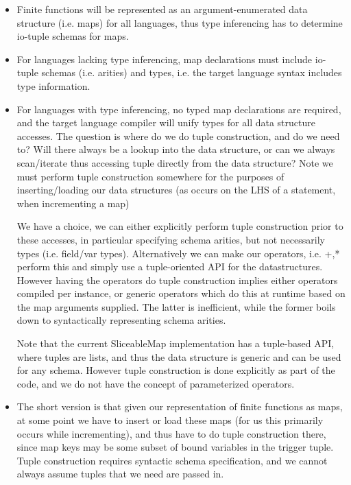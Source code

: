 \noindent{}
\begin{itemize}
  \item Finite functions will be represented as an argument-enumerated data
  structure (i.e. maps) for all languages, thus type inferencing has to
  determine io-tuple schemas for maps.
  \item For languages lacking type inferencing, map declarations must include
  io-tuple schemas (i.e. arities) and types, i.e. the target language syntax
  includes type information.
  \item For languages with type inferencing, no typed map declarations are
  required, and the target language compiler will unify types for all data
  structure accesses.
  The question is where do we do tuple construction, and do we need to? 
  Will there always be a lookup into the data structure, or can we always
  scan/iterate thus accessing tuple directly from the data structure?
  Note we must perform tuple construction somewhere for the purposes of
  inserting/loading our data structures (as occurs on the LHS of a statement,
  when incrementing a map)
  
  We have a choice, we can either explicitly perform tuple construction
  prior to these accesses, in particular specifying schema arities, but not
  necessarily types (i.e. field/var types).
  Alternatively we can make our operators, i.e. +,* perform this and simply use
  a tuple-oriented API for the datastructures. However having the operators do
  tuple construction implies either operators compiled per instance, or generic
  operators which do this at runtime based on the map arguments supplied. The
  latter is inefficient, while the former boils down to syntactically
  representing schema arities.
  
  Note that the current SliceableMap implementation has a tuple-based API,
  where tuples are lists, and thus the data structure is generic and can be
  used for any schema. However tuple construction is done explicitly as part of
  the code, and we do not have the concept of parameterized operators.
  
  \item The short version is that given our representation of finite functions
  as maps, at some point we have to insert or load these maps (for us this
  primarily occurs while incrementing), and thus have to do tuple construction
  there, since map keys may be some subset of bound variables in the trigger
  tuple. Tuple construction requires syntactic schema specification, and we
  cannot always assume tuples that we need are passed in.
\end{itemize}

